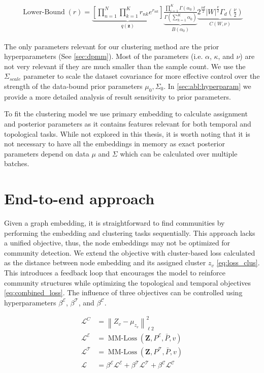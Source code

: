 \begin{align}
    \operatorname{Lower-Bound}(r) = 
    \underbrace{\left[ \prod_{n=1}^{N} \prod_{k=1}^K r_{nk} e^{r_{nk}} \right]}_{q(\mathbf{z})}
    \underbrace{\frac{\prod_{i=1}^K \Gamma(\alpha_0)}{\Gamma \left( \sum_{k=1}^K \alpha_0 \right)}}_{B(\alpha_0)}
    \underbrace{2^{\frac{\nu d}{2}} |W|^{\frac{\nu}{2}} \Gamma_d \left(\frac{\nu}{2} \right)}_{C(W, \nu)} \label{eq:var_lb}
\end{align}

The only parameters relevant for our clustering method are the prior hyperparameters (See \cref{sec:dpmm}).
Most of the parameters (i.e. $\alpha$, $\kappa$, and $\nu$) are not very relevant if they are much smaller than the sample count.
We use the $\Sigma_{scale}$ parameter to scale the dataset covariance for more effective control over the strength of the data-bound prior parameters $\mu_0, \Sigma_0$.
In \cref{sec:abl:hyperparam} we provide a more detailed analysis of result sensitivity to prior parameters.

To fit the clustering model we use primary embedding to calculate assignment and posterior parameters as it contains features relevant for both temporal and topological tasks.
While not explored in this thesis, it is worth noting that it is not necessary to have all the embeddings in memory as exact posterior parameters depend on data $\mu$ and $\Sigma$ which can be calculated over multiple batches.

\section{End-to-end approach}
Given a graph embedding, it is straightforward to find communities by performing the embedding and clustering tasks sequentially. 
This approach lacks a unified objective, thus, the node embeddings may not be optimized for community detection.
We extend the objective with cluster-based loss calculated as the distance between node embedding and its assigned cluster $z_v$ \cref{eq:loss_clus}.
This introduces a feedback loop that encourages the model to reinforce community structures while optimizing the topological and temporal objectives \cref{eq:combined_loss}.
%
The influence of three objectives can be controlled using hyperparameters $\beta^{\mathcal{E}}$, $\beta^{\mathcal{T}}$, and $\beta^{\mathcal{C}}$.

\begin{align}
    \mathcal{L}^{C} &= \left\|Z_v - \mu_{z_v} \right\|^2_{\ell 2} \label{eq:loss_clus} \\
    \mathcal{L}^{\mathcal{E}} &= \operatorname{MM-Loss}(\mathbf{Z}, P^{\mathcal{E}}, \bar{P}, v) \label{eq:loss_topo} \\
    \mathcal{L}^{\mathcal{T}} &= \operatorname{MM-Loss}(\mathbf{Z}, P^{\mathcal{T}}, \bar{P}, v) \label{eq:loss_tempo}\\
    \mathcal{L} &= \beta^{\mathcal{E}} \mathcal{L}^{\mathcal{E}} + \beta^{\mathcal{T}} \mathcal{L}^{\mathcal{T}} + \beta^{\mathcal{C}} \mathcal{L}^{\mathcal{C}} \label{eq:combined_loss}
\end{align}



